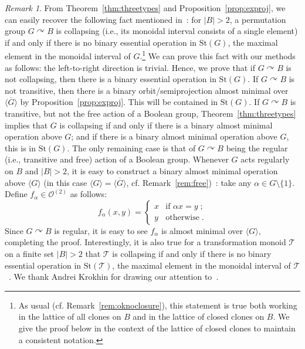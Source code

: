 \documentclass{article}
\theoremstyle{remark}
\newtheorem{remark}[theorem]{Remark}
\theoremstyle{definition}
\def\acts{\curvearrowright}
\begin{document}
\begin{remark}\label{rem:binarysuff} From Theorem~\ref{thm:threetypes} and Proposition~\ref{prop:exproj}, we can easily recover the following fact mentioned in~\cite[Remark 7]{palfy1982contributions}: for $|B|>2$, a permutation group $G\acts B$ is collapsing (i.e., its monoidal interval consists of a single element) if and only if there is no binary essential operation in $\mathrm{St}(G)$, the maximal element in the monoidal interval of $G$.\footnote{As usual (cf. Remark~\ref{rem:oknoclosure}), this statement is true both working in the lattice of all clones on $B$ and in the lattice of closed clones on $B$. We give the proof below in the context of the lattice of closed clones to maintain a consistent notation.} We can prove this fact with our methods as follows: the left-to-right direction is trivial. Hence, we prove that if $G\acts B$ is not collapsing, then there is a binary essential operation in $\mathrm{St}(G)$. If $G\acts B$ is not transitive, then there is a binary orbit\-/semiprojection almost minimal over $\overline{\langle G \rangle}$ by Proposition~\ref{prop:exproj}. This will be contained in $\mathrm{St}(G)$. If $G\acts B$ is transitive, but not the free action of a Boolean group, Theorem~\ref{thm:threetypes} implies that $G$ is collapsing if and only if there is a binary almost minimal operation above $G$; and if there is a binary almost minimal operation above $G$, this is in $\mathrm{St}(G)$. The only remaining case is that of $G\acts B$ being the regular (i.e., transitive and free) action of a Boolean group. Whenever $G$ acts regularly on $B$ and $|B|>2$, it is easy to construct a binary almost minimal operation above $\langle G\rangle$ (in this case $\langle G\rangle=\overline{\langle G\rangle}$, cf. Remark~\ref{rem:free})~\cite[Proposition 6]{palfy1982contributions}: take any $\alpha\in G\setminus\{1\}$. Define $f_\alpha\in\mathcal{O}^{(2)}$ as follows:
\[f_\alpha(x,y)=\begin{cases}
    x &\text{if } \alpha x=y\; ;\\
    y &\text{otherwise}\;.
\end{cases}\]
Since $G\acts B$ is regular, it is easy to see $f_\alpha$ is almost minimal over $\langle G\rangle$, completing the proof. Interestingly, it is also true for a transformation monoid $\mathcal{T}$ on a finite set $|B|>2$ that $\mathcal{T}$ is collapsing  if and only if there is no binary essential operation in $\mathrm{St}(\mathcal{T})$, the maximal element in the monoidal interval of $\mathcal{T}$~\cite{grabowski1997binary}. We thank Andrei Krokhin for drawing our attention to~\cite{grabowski1997binary}.
\end{remark}
\end{document}
